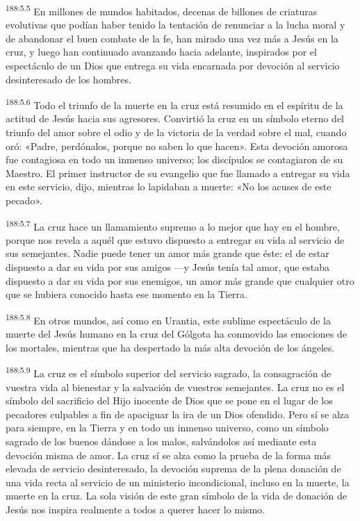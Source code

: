 \par 
\textsuperscript{188:5.5} En millones de mundos habitados, decenas de billones de criaturas evolutivas que podían haber tenido la tentación de renunciar a la lucha moral y de abandonar el buen combate de la fe, han mirado una vez más a Jesús en la cruz, y luego han continuado avanzando hacia adelante, inspirados por el espectáculo de un Dios que entrega su vida encarnada por devoción al servicio desinteresado de los hombres.

\par 
\textsuperscript{188:5.6} Todo el triunfo de la muerte en la cruz está resumido en el espíritu de la actitud de Jesús hacia sus agresores. Convirtió la cruz en un símbolo eterno del triunfo del amor sobre el odio y de la victoria de la verdad sobre el mal, cuando oró: «Padre, perdónalos, porque no saben lo que hacen». Esta devoción amorosa fue contagiosa en todo un inmenso universo; los discípulos se contagiaron de su Maestro. El primer instructor de su evangelio que fue llamado a entregar su vida en este servicio, dijo, mientras lo lapidaban a muerte: «No los acuses de este pecado».

\par 
\textsuperscript{188:5.7} La cruz hace un llamamiento supremo a lo mejor que hay en el hombre, porque nos revela a aquél que estuvo dispuesto a entregar su vida al servicio de sus semejantes. Nadie puede tener un amor más grande que éste: el de estar dispuesto a dar su vida por sus amigos ---y Jesús tenía tal amor, que estaba dispuesto a dar su vida por sus enemigos, un amor más grande que cualquier otro que se hubiera conocido hasta ese momento en la Tierra.

\par 
\textsuperscript{188:5.8} En otros mundos, así como en Urantia, este sublime espectáculo de la muerte del Jesús humano en la cruz del Gólgota ha conmovido las emociones de los mortales, mientras que ha despertado la más alta devoción de los ángeles.

\par 
\textsuperscript{188:5.9} La cruz es el símbolo superior del servicio sagrado, la consagración de vuestra vida al bienestar y la salvación de vuestros semejantes. La cruz no es el símbolo del sacrificio del Hijo inocente de Dios que se pone en el lugar de los pecadores culpables a fin de apaciguar la ira de un Dios ofendido. Pero sí se alza para siempre, en la Tierra y en todo un inmenso universo, como un símbolo sagrado de los buenos dándose a los malos, salvándolos así mediante esta devoción misma de amor. La cruz sí se alza como la prueba de la forma más elevada de servicio desinteresado, la devoción suprema de la plena donación de una vida recta al servicio de un ministerio incondicional, incluso en la muerte, la muerte en la cruz. La sola visión de este gran símbolo de la vida de donación de Jesús nos inspira realmente a todos a querer hacer lo mismo.

